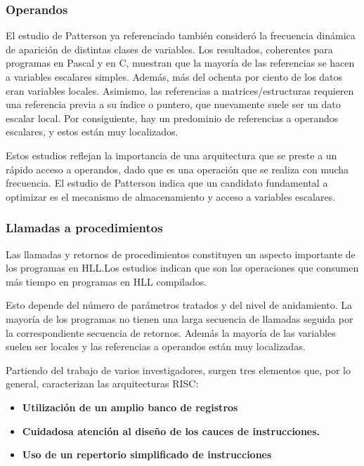 \subsubsection*{Operandos}

El estudio de Patterson ya referenciado también consideró la frecuencia dinámica de aparición de distintas clases de variables. Los resultados, coherentes para programas en Pascal y en C, muestran que la mayoría de las referencias se hacen a variables escalares simples. Además, más del ochenta por ciento de los datos  eran variables locales. Asimismo, las referencias a matrices/estructuras requieren una referencia previa a su índice o puntero, que nuevamente suele ser un dato escalar local. Por consiguiente, hay un predominio de referencias a operandos escalares, y estos están muy localizados.

Estos estudios reflejan la importancia de una arquitectura que se preste a un rápido acceso a operandos, dado que es una operación que se realiza con mucha frecuencia. El estudio de Patterson indica que un candidato fundamental a optimizar es el mecanismo de almacenamiento y acceso a variables escalares.

\subsubsection*{Llamadas a procedimientos}

Las llamadas y retornos de procedimientos constituyen un aspecto importante de los programas en HLL.\@ Los estudios indican que son las operaciones que consumen más tiempo en programas en HLL compilados.

Esto depende del número de parámetros tratados y del nivel de anidamiento. La mayoría de los programas no tienen una larga secuencia de llamadas seguida por la correspondiente secuencia de retornos. Además la mayoría de las variables suelen ser locales y las referencias a operandos están muy localizadas.

Partiendo del trabajo de varios investigadores, surgen tres elementos que, por lo general, caracterizan las arquitecturas RISC:\@

\begin{itemize}
  \item \textbf{Utilización de un amplio banco de registros}
  \item \textbf{Cuidadosa atención al diseño de los cauces de instrucciones.}
  \item \textbf{Uso de un repertorio simplificado de instrucciones}
\end{itemize}


